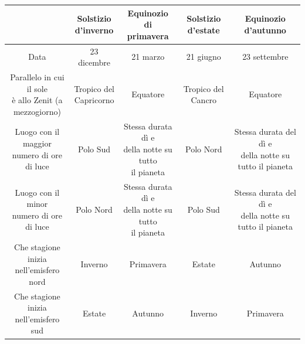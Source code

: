 \documentclass[a4paper]{article}
\begin{document}
\begin{center}
\begin{tabular}{|c|c|c|c|c|}
    \hline
    & \makecell{Solstizio \\ d'inverno} & \makecell{Equinozio di\\ primavera} & \makecell{Solstizio \\d'estate} & \makecell{Equinozio \\d'autunno} \\
    \hline
    Data & 23 dicembre & 21 marzo & 21 giugno & 23 settembre \\
    \hline
    \makecell{Parallelo in cui il sole \\ è allo Zenit (a \\ mezzogiorno)} & \makecell{Tropico del \\Capricorno} & Equatore & Tropico del Cancro & Equatore \\
    \hline
    \makecell{Luogo con il maggior \\ numero di ore di luce} & Polo Sud & \makecell{Stessa durata dì e \\ della notte su tutto \\ il pianeta} & Polo Nord & \makecell{Stessa durata del dì e\\ della notte su tutto il pianeta} \\
    \hline
    \makecell{Luogo con il minor \\ numero di ore di luce} & Polo Nord & \makecell{Stessa durata dì e \\ della notte su tutto \\ il pianeta} & Polo Sud & \makecell{Stessa durata del dì e\\ della notte su tutto il pianeta} \\
    \hline
    \makecell{Che stagione inizia \\ nell'emisfero nord} & Inverno & Primavera & Estate & Autunno \\
    \hline
    \makecell{Che stagione inizia \\ nell'emisfero sud} & Estate & Autunno & Inverno & Primavera \\
    \hline
\end{tabular}
\end{center}

\end{document}
